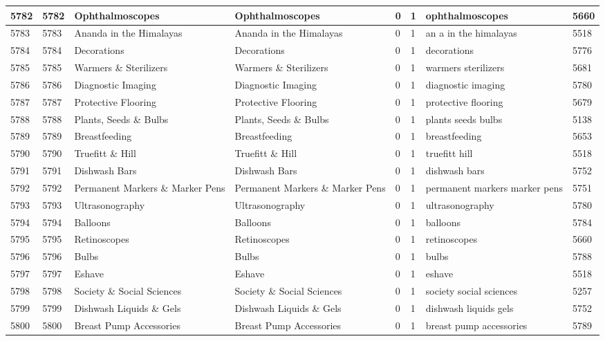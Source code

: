\begin{longtable}{|l|l|l|l|l|l|l|l|}
5782 & 5782 & Ophthalmoscopes & Ophthalmoscopes & 0 & 1 & ophthalmoscopes & 5660 \\ \hline 
5783 & 5783 & Ananda in the Himalayas & Ananda in the Himalayas & 0 & 1 & an a in the himalayas & 5518 \\ \hline 
5784 & 5784 & Decorations & Decorations & 0 & 1 & decorations & 5776 \\ \hline 
5785 & 5785 & Warmers \& Sterilizers & Warmers \& Sterilizers & 0 & 1 & warmers sterilizers & 5681 \\ \hline 
5786 & 5786 & Diagnostic Imaging & Diagnostic Imaging & 0 & 1 & diagnostic imaging & 5780 \\ \hline 
5787 & 5787 & Protective Flooring & Protective Flooring & 0 & 1 & protective flooring & 5679 \\ \hline 
5788 & 5788 & Plants, Seeds \& Bulbs & Plants, Seeds \& Bulbs & 0 & 1 & plants seeds bulbs & 5138 \\ \hline 
5789 & 5789 & Breastfeeding & Breastfeeding & 0 & 1 & breastfeeding & 5653 \\ \hline 
5790 & 5790 & Truefitt \& Hill & Truefitt \& Hill & 0 & 1 & truefitt hill & 5518 \\ \hline 
5791 & 5791 & Dishwash Bars & Dishwash Bars & 0 & 1 & dishwash bars & 5752 \\ \hline 
5792 & 5792 & Permanent Markers \& Marker Pens & Permanent Markers \& Marker Pens & 0 & 1 & permanent markers marker pens & 5751 \\ \hline 
5793 & 5793 & Ultrasonography & Ultrasonography & 0 & 1 & ultrasonography & 5780 \\ \hline 
5794 & 5794 & Balloons & Balloons & 0 & 1 & balloons & 5784 \\ \hline 
5795 & 5795 & Retinoscopes & Retinoscopes & 0 & 1 & retinoscopes & 5660 \\ \hline 
5796 & 5796 & Bulbs & Bulbs & 0 & 1 & bulbs & 5788 \\ \hline 
5797 & 5797 & Eshave & Eshave & 0 & 1 & eshave & 5518 \\ \hline 
5798 & 5798 & Society \& Social Sciences & Society \& Social Sciences & 0 & 1 & society social sciences & 5257 \\ \hline 
5799 & 5799 & Dishwash Liquids \& Gels & Dishwash Liquids \& Gels & 0 & 1 & dishwash liquids gels & 5752 \\ \hline 
5800 & 5800 & Breast Pump Accessories & Breast Pump Accessories & 0 & 1 & breast pump accessories & 5789 \\ \hline 

\end{longtable}
